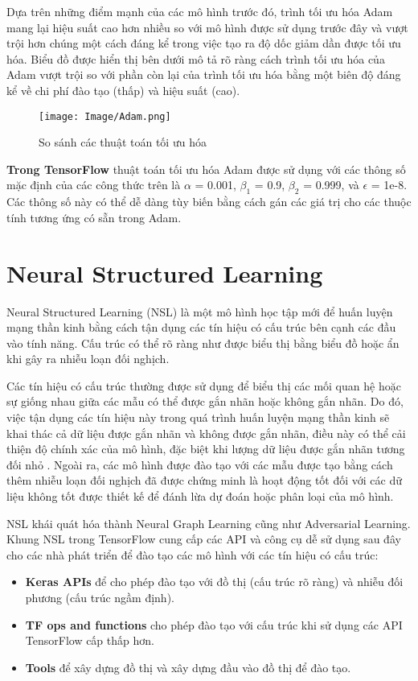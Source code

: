 Dựa trên những điểm mạnh của các mô hình trước đó, trình tối ưu hóa Adam mang lại hiệu suất cao hơn nhiều so với mô hình được sử dụng trước đây và vượt trội hơn
chúng một cách đáng kể trong việc tạo ra độ dốc giảm dần được tối ưu hóa. Biểu đồ được hiển thị bên dưới mô tả rõ ràng cách trình tối ưu hóa của Adam vượt trội 
so với phần còn lại của trình tối ưu hóa bằng một biên độ đáng kể về chi phí đào tạo (thấp) và hiệu suất (cao). 

\begin{figure}[h!]
    \centering
    \texttt{[image: Image/Adam.png]}
    \caption{So sánh các thuật toán tối ưu hóa}
    \label{Hình 1.1: Graph Neural Network}
    \cite*{WEBSITE:3}
\end{figure}


\textbf{Trong TensorFlow} thuật toán tối ưu hóa Adam được sử dụng với các thông số mặc định của các công thức trên là $\alpha$ = 0.001, $\beta_1$ = 0.9, $\beta_2$ = 0.999, và $\epsilon$ = 1e-8. 
Các thông số này có thể dễ dàng tùy biến bằng cách gán các giá trị cho các thuộc tính tương ứng có sẵn trong Adam.


\section{Neural Structured Learning}
Neural Structured Learning (NSL) là một mô hình học tập mới để huấn luyện mạng thần kinh bằng cách tận dụng các tín hiệu có cấu trúc bên cạnh các đầu vào tính 
năng. Cấu trúc có thể rõ ràng như được biểu thị bằng biểu đồ hoặc ẩn khi gây ra nhiễu loạn đối nghịch.

Các tín hiệu có cấu trúc thường được sử dụng để biểu thị các mối quan hệ hoặc sự giống nhau giữa các mẫu có thể được gắn nhãn hoặc không gắn nhãn. Do đó, việc 
tận dụng các tín hiệu này trong quá trình huấn luyện mạng thần kinh sẽ khai thác cả dữ liệu được gắn nhãn và không được gắn nhãn, điều này có thể cải thiện độ 
chính xác của mô hình, đặc biệt khi lượng dữ liệu được gắn nhãn tương đối nhỏ . Ngoài ra, các mô hình được đào tạo với các mẫu được tạo bằng cách thêm nhiễu loạn 
đối nghịch đã được chứng minh là hoạt động tốt đối với các dữ liệu không tốt được thiết kế để đánh lừa dự đoán hoặc phân loại của mô hình.

NSL khái quát hóa thành Neural Graph Learning cũng như Adversarial Learning. Khung NSL trong TensorFlow cung cấp các API và công cụ dễ sử dụng sau đây cho các 
nhà phát triển để đào tạo các mô hình với các tín hiệu có cấu trúc:
\begin{itemize}
    \item \textbf{Keras APIs} để cho phép đào tạo với đồ thị (cấu trúc rõ ràng) và nhiễu đối phương (cấu trúc ngầm định).
    \item \textbf{TF ops and functions} cho phép đào tạo với cấu trúc khi sử dụng các API TensorFlow cấp thấp hơn.
    \item \textbf{Tools} để xây dựng đồ thị và xây dựng đầu vào đồ thị để đào tạo.
\end{itemize}

